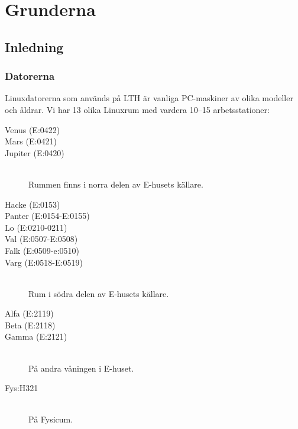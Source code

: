 \documentclass[a4paper,twocolumn]{book}
\begin{document}
\mainmatter

\chapter{Grunderna}
\label{cha:grunderna}



\section{Inledning}


\subsection{Datorerna}

Linuxdatorerna som används på LTH är vanliga PC-maskiner av olika
modeller och åldrar. Vi har 13 olika Linuxrum med
vardera 10--15 arbetsstationer:
\begin{description}
  \item[Venus (E:0422)]
  \item[Mars (E:0421)]
  \item[Jupiter (E:0420)] \mbox{}\\
    Rummen finns i norra delen av E-husets källare.
  \item[Hacke (E:0153)]
  \item[Panter (E:0154-E:0155)]
  \item[Lo (E:0210-0211)]
  \item[Val (E:0507-E:0508)]
  \item[Falk (E:0509-e:0510)]
  \item[Varg (E:0518-E:0519)] \mbox{}\\
    Rum i södra delen av E-husets källare.
  \item[Alfa (E:2119)]
  \item[Beta (E:2118)]
  \item[Gamma (E:2121)] \mbox{}\\
    På andra våningen i E-huset.
  \item[Fys:H321] \mbox{}\\
    På Fysicum.
\end{description}
\end{document}
